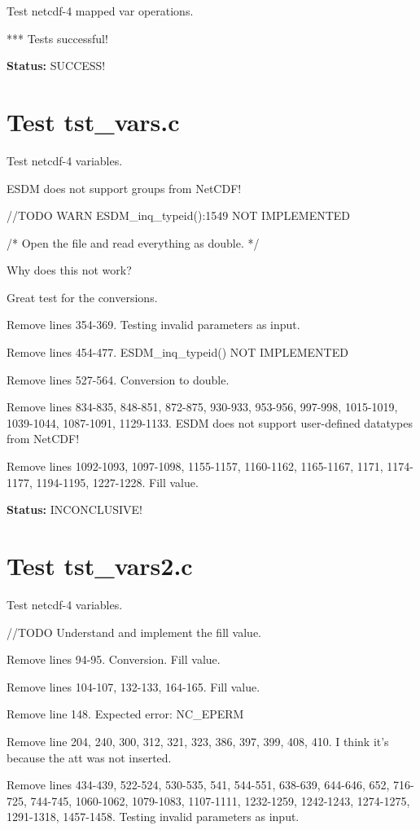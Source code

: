 Test netcdf-4 mapped var operations.

*** Tests successful!

{\bf \large Status: } SUCCESS!

\section{Test tst\_vars.c}

Test netcdf-4 variables.

ESDM does not support groups from NetCDF!

//TODO WARN ESDM\_inq\_typeid():1549 NOT IMPLEMENTED

/* Open the file and read everything as double. */

Why does this not work?

Great test for the conversions.

Remove lines 354-369. Testing invalid parameters as input.

Remove lines 454-477. ESDM\_inq\_typeid() NOT IMPLEMENTED

Remove lines 527-564. Conversion to double.

Remove lines 834-835, 848-851, 872-875, 930-933, 953-956, 997-998, 1015-1019, 1039-1044, 1087-1091, 1129-1133. ESDM does not support user-defined datatypes from NetCDF!

Remove lines 1092-1093, 1097-1098, 1155-1157, 1160-1162, 1165-1167, 1171, 1174-1177, 1194-1195, 1227-1228. Fill value.

{\bf \large Status: } INCONCLUSIVE!

\section{Test tst\_vars2.c}

Test netcdf-4 variables.

//TODO Understand and implement the fill value.

Remove lines 94-95. Conversion. Fill value.

Remove lines 104-107, 132-133, 164-165. Fill value.

Remove line 148. Expected error: NC\_EPERM

Remove line 204, 240, 300, 312, 321, 323, 386, 397, 399, 408, 410. I think it's because the att was not inserted.

Remove lines 434-439, 522-524, 530-535, 541, 544-551, 638-639, 644-646, 652, 716-725, 744-745, 1060-1062, 1079-1083, 1107-1111, 1232-1259, 1242-1243, 1274-1275, 1291-1318, 1457-1458. Testing invalid parameters as input.

